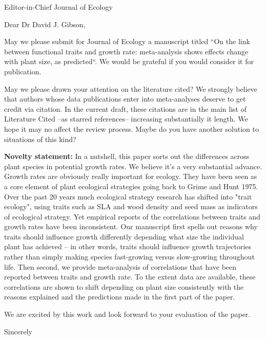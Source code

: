\documentclass{letter}
\begin{document}
\begin{letter}{Editor-in-Chief Journal of Ecology}
\opening{Dear Dr David J. Gibson,}


May we please submit for Journal of Ecology a manuscript titled ``On the link between functional traits and growth rate: meta-analysis shows effects change with plant size, as predicted``. We would be grateful if you would consider it for publication.

May we please drawn your attention on the literature cited? We strongly believe that authors whose data publications enter into meta-analyses deserve to get credit via citation. In the current draft, these citations are in the main list of Literature Cited --as starred references-- increasing substantially it length. We hope it may no affect the review process. Maybe do you have another solution to situations of this kind?

\textbf{Novelty statement:}
In a nutshell, this paper sorts out the differences across plant species in potential growth rates. We believe it's a very substantial advance. Growth rates are obviously really important for ecology. They have been seen as a core element of plant ecological strategies going back to Grime and Hunt 1975. Over the past 20 years much ecological strategy research has shifted into "trait ecology", using traits such as SLA and wood density and seed mass as indicators of ecological strategy. Yet empirical reports of the correlations between traits and growth rates have been inconsistent. Our manuscript first spells out reasons why traits should influence growth differently depending what size the individual plant has achieved -- in other words, traits should influence growth trajectories rather than simply making species fast-growing versus slow-growing throughout life. Then second, we provide meta-analysis of correlations that have been reported between traits and growth rate. To the extent data are available, these correlations are shown to shift depending on plant size consistently with the reasons explained and the predictions made in the first part of the paper.  


We are excited by this work and look forward to your evaluation of the paper.


\closing{Sincerely}


\end{letter}
\end{document}
